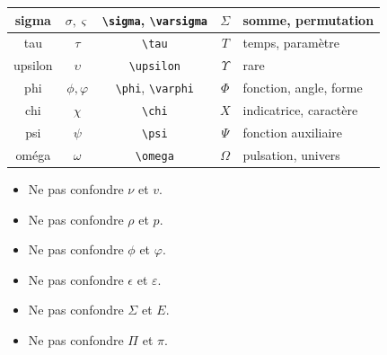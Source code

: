 \documentclass[11pt,a4paper]{article}
\begin{document}
\begin{center}
\begin{tabularx}{\textwidth}{|c|c|c|c|X|}
\hline
sigma & \(\sigma,\varsigma\) & \verb|\sigma|, \verb|\varsigma| & \(\Sigma\) & somme, permutation\\
\hline
tau & \(\tau\) & \verb|\tau| & \(T\) & temps, paramètre\\
\hline
upsilon & \(\upsilon\) & \verb|\upsilon| & \(\Upsilon\) & rare\\
\hline
phi & \(\phi,\varphi\) & \verb|\phi|, \verb|\varphi| & \(\Phi\) & fonction, angle, forme\\
\hline
chi & \(\chi\) & \verb|\chi| & \(X\) & indicatrice, caractère\\
\hline
psi & \(\psi\) & \verb|\psi| & \(\Psi\) & fonction auxiliaire\\
\hline
oméga & \(\omega\) & \verb|\omega| & \(\Omega\) & pulsation, univers\\
\hline
\end{tabularx}
\end{center}
\renewcommand{\arraystretch}{1}

\begin{erreurbox}
\begin{itemize}
    \item Ne pas confondre \(\nu\) et \(v\).
    \item Ne pas confondre \(\rho\) et \(p\).
    \item Ne pas confondre \(\phi\) et \(\varphi\).
    \item Ne pas confondre \(\epsilon\) et \(\varepsilon\).
    \item Ne pas confondre \(\Sigma\) et \(E\).
    \item Ne pas confondre \(\Pi\) et \(\pi\).
\end{itemize}
\end{erreurbox}
\end{document}
